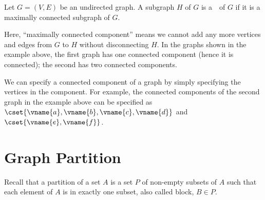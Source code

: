 \begin{cluster}
\label{grp:def:bg::graphs::cc}

\begin{definition}
\label{def:bg::graphs::cc}
Let $G = (V,E)$ be an undirected graph.  A subgraph $H$ of $G$ is
a~~of $G$ if it is a maximally connected
subgraph of $G$.

\end{definition}
\end{cluster}

\begin{cluster}
\label{grp:grm:bg::graphs::maximally}

\begin{gram}
\label{grm:bg::graphs::maximally}
Here, ``maximally connected component'' means we cannot add any more
vertices and edges from $G$ to $H$ without disconnecting $H$. In the
graphs shown in the example above, the first graph has one connected
component (hence it is connected); the second has two connected
components.

\end{gram}
\end{cluster}

\begin{cluster}
\label{grp:nt:bg::graphs::specify}

\begin{note}
\label{nt:bg::graphs::specify}
We can specify a connected component of a graph by simply specifying the
vertices in the component.
For example, the connected components of the second graph in the
example above can be specified as
$\cset{\vname{a},\vname{b},\vname{c},\vname{d}}$
and 
$\cset{\vname{e},\vname{f}}$.

\end{note}
\end{cluster}


\section{Graph Partition}
\label{sec:bg::graphs::partition}

\begin{cluster}
\label{grp:grm:bg::graphs::partition}

\begin{gram}
\label{grm:bg::graphs::partition}
Recall that a partition of a set $A$ is a set $P$ of non-empty subsets
of $A$ such that each element of $A$ is in exactly one subset, also
called block, $B \in P$.

\end{gram}
\end{cluster}

